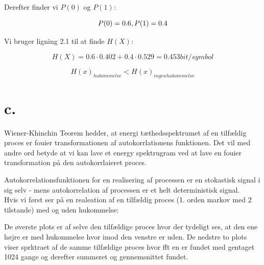 Derefter finder vi $P(0)$ og $P(1)$:

\begin{equation}
P(0) = 0.6 \\,\\P(1) = 0.4
\end{equation}

Vi bruger ligning 2.1 til at finde $H(X)$:

 \begin{equation}
H(X) = 0.6\cdot 0.402+0.4 \cdot 0.529 = 0.453 bit/symbol
\end{equation} 



\begin{equation}
H(x)_{hukommelse}<H(x)_{ingen hukommelse}
\end{equation}



\section{c.}

Wiener-Khinchin Teorem hedder, at energi tæthedsspektrumet af en tilfældig proces er fouier transformationen af autokorrlationens funktionen. Det vil med andre ord betyde at vi kan lave et energy spektrugram ved at lave en fouier transformation på den autokorrlaieret proces.
 
Autokorrelationsfunktionen for en realisering af processen er en stokastisk signal i sig selv - mens autokorrelation af processen er et helt deterministisk signal.\\
Hvis vi først ser på en realeation af en tilfældig proces (1. orden markov med 2 tilstande) med og uden hukommelse:

De øverste plots er af selve den tilfældige proces hvor der tydeligt ses, at den ene højre er med hukommelse hvor imod den venstre er uden. De nedstre to plots viser sprktraet af de samme tilfældige proces hvor fft en er fundet med gentaget 1024 gange og derefter summeret og gennemsnittet fundet.

